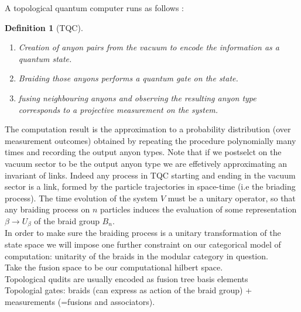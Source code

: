 \documentclass{article}
\newtheorem{definition}{Definition}
\begin{document}
A topological quantum computer runs as follows \cite{Rowell17}:
\begin{definition}[TQC]
	\begin{enumerate}
		\item Creation of anyon pairs from the vacuum to encode the information as a quantum state.
		\item Braiding those anyons performs a quantum gate on the state.
		\item fusing neighbouring anyons and observing the resulting anyon type corresponds to a projective measurement on the system.
	\end{enumerate}
\end{definition}
The computation result is the approximation to a probability distribution (over measurement outcomes) obtained by repeating the procedure polynomially many times and recording the output anyon types. Note that if we postselct on the vacuum sector to be the output anyon type we are effetively approximating an invariant of links. Indeed any process in TQC starting and ending in the vacuum sector is a link, formed by the particle trajectories in space-time (i.e the briading process). The time evolution of the system $V$ must be a unitary operator, so that any braiding process on $n$ particles induces the evaluation of some representation $\beta \rightarrow U_\beta$ of the braid group $B_n$.\\
In order to make sure the braiding process is a unitary transformation of the state space we will impose one further constraint on our categorical model of computation: unitarity of the braids in the modular category in question.\\
Take the fusion space to be our computational hilbert space.\\
Topological qudits are usually encoded as fusion tree basis elements\\
Topologial gates: braids (can express as action of the braid group) + measurements (=fusions and associators).
\end{document}
